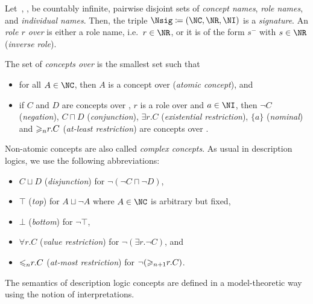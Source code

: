 \begin{definition}
  \label{def:syntax-concepts}
  Let~\NC, \NR, \NI be countably infinite, pairwise disjoint sets of
  \emph{concept names}, \emph{role names}, and \emph{individual names}. Then, the triple
  $\Nsig\coloneqq(\NC,\NR,\NI)$ is a \emph{signature}. An \emph{role $r$ over \Nsig} is either
  a role name, i.e.~$r\in\NR$, or it is of the form $s^{-}$ with $s\in\NR$ (\emph{inverse role}).

  The set of \emph{concepts over \Nsig} is the smallest set such that
  \begin{itemize}
  \item for all $A\in\NC$, then $A$ is a concept over \Nsig (\emph{atomic concept}), and
  \item if $C$ and $D$ are concepts over \Nsig, $r$ is a role over \Nsig and $a\in\NI$, then
    $\lnot C$ (\emph{negation}), $C\sqcap D$ (\emph{conjunction}), $\exists r.C$ (\emph{existential
      restriction}), $\{a\}$ (\emph{nominal}) and ${\geqslant_{n}}r.C$ (\emph{at-least restriction})
    are concepts over \Nsig. \qedhere
  \end{itemize}
\end{definition}

\noindent Non-atomic concepts are also called \emph{complex concepts}. As usual in description
logics, we use the following abbreviations:
\begin{itemize}
\item $C\sqcup D$ (\emph{disjunction}) for $\lnot(\lnot C \sqcap \lnot D)$,
\item $\top$ (\emph{top}) for $A \sqcup \lnot A$ where $A\in\NC$ is arbitrary but fixed,
\item $\bot$ (\emph{bottom}) for $\lnot\top$,
\item $\forall r.C$ (\emph{value restriction}) for $\lnot(\exists r.\lnot C)$, and
\item ${\leqslant_{n}}r.C$ (\emph{at-most restriction}) for $\lnot({\geqslant_{n+1}}r.C)$.
\end{itemize}

\noindent
The semantics of description logic concepts are defined in a model-theoretic way using the notion of
interpretations.

